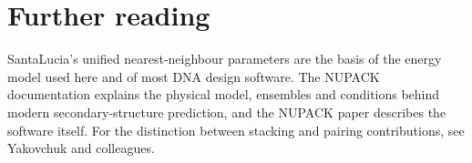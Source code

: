 \section*{Further reading}
SantaLucia's unified nearest-neighbour parameters are the basis of the energy
model used here and of most DNA design software.\cite{SantaLucia1998} The
NUPACK documentation explains the physical model, ensembles and conditions
behind modern secondary-structure prediction,\cite{NUPACKmodel} and the NUPACK
paper describes the software itself.\cite{Zadeh2011} For the distinction between
stacking and pairing contributions, see Yakovchuk and colleagues.\cite{Yakovchuk2006}
